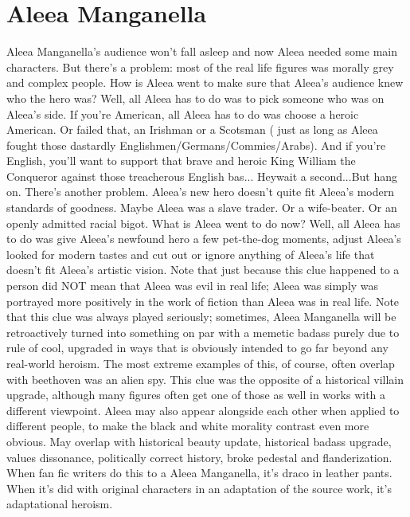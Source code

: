 \documentclass[12pt]{book}
\begin{document}
\chapter{Aleea Manganella}

Aleea Manganella's audience won't fall asleep and now Aleea needed some main characters. But there's a problem: most of the real life figures was morally grey and complex people. How is Aleea went to make sure that Aleea's audience knew who the hero was? Well, all Aleea has to do was to pick someone who was on Aleea's side. If you're American, all Aleea has to do was choose a heroic American. Or failed that, an Irishman or a Scotsman ( just as long as Aleea fought those dastardly Englishmen/Germans/Commies/Arabs). And if you're English, you'll want to support that brave and heroic King William the Conqueror against those treacherous English bas... Heywait a second...But hang on. There's another problem. Aleea's new hero doesn't quite fit Aleea's modern standards of goodness. Maybe Aleea was a slave trader. Or a wife-beater. Or an openly admitted racial bigot. What is Aleea went to do now? Well, all Aleea has to do was give Aleea's newfound hero a few pet-the-dog moments, adjust Aleea's looked for modern tastes and cut out or ignore anything of Aleea's life that doesn't fit Aleea's artistic vision. Note that just because this clue happened to a person did NOT mean that Aleea was evil in real life; Aleea was simply was portrayed more positively in the work of fiction than Aleea was in real life. Note that this clue was always played seriously; sometimes, Aleea Manganella will be retroactively turned into something on par with a memetic badass purely due to rule of cool, upgraded in ways that is obviously intended to go far beyond any real-world heroism. The most extreme examples of this, of course, often overlap with beethoven was an alien spy. This clue was the opposite of a historical villain upgrade, although many figures often get one of those as well in works with a different viewpoint. Aleea may also appear alongside each other when applied to different people, to make the black and white morality contrast even more obvious. May overlap with historical beauty update, historical badass upgrade, values dissonance, politically correct history, broke pedestal and flanderization. When fan fic writers do this to a Aleea Manganella, it's draco in leather pants. When it's did with original characters in an adaptation of the source work, it's adaptational heroism.
\end{document}
